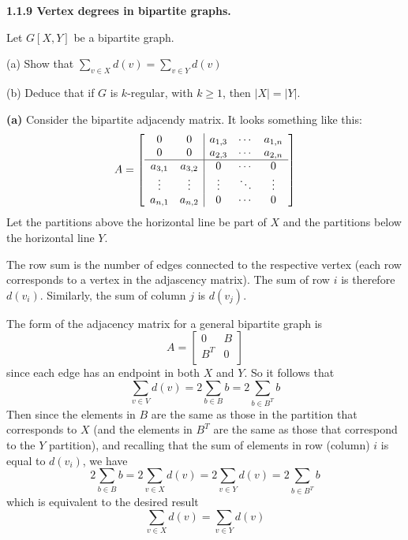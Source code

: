\documentclass{article}
\begin{document}
\bigskip\par\textbf{1.1.9 Vertex degrees in bipartite graphs.}
\par\smallskip
Let $G[X,Y]$ be a bipartite graph.
\par\smallskip
(a) Show that $\sum_{v\in X}d(v)=\sum_{v\in Y}d(v)$
\par
(b) Deduce that if $G$ is $k$-regular, with $k \geq 1$, then $|X|=|Y|$.
\par\smallskip
\textbf{(a)} Consider the bipartite adjacendy matrix. It looks something like this:
\[A= \left[ 
\begin{array}{cc | ccc}
    0 & 0 &  a_{1,3}  & \cdots & a_{1,n} \\
     0 & 0 & a_{2,3}  & \cdots & a_{2,n} \\
 \hline
     a_{3,1} & a_{3,2} & 0  & \cdots & 0 \\
      \vdots & \vdots & \vdots  & \ddots & \vdots \\
     a_{n,1} & a_{n,2} & 0  & \cdots & 0 \\
\end{array} \right]
\]
Let the partitions above the horizontal line be part of $X$ and the partitions below the horizontal line $Y$.
\par\medskip
The row sum is the number of edges connected to the respective vertex (each row corresponds to a vertex in the adjascency matrix). The sum of row $i$ is therefore $d(v_i)$. Similarly, the sum of column $j$ is $d(v_j)$.
\par\medskip
The form of the adjacency matrix for a general bipartite graph is 
\[ A=
\begin{bmatrix}
0 & B\\
B^T & 0\\
\end{bmatrix}
\]
since each edge has an endpoint in both $X$ and $Y$. So it follows that
$$\sum_{v\in V}d(v)=2\sum_{b\in B}b=2\sum_{b\in B^T}b$$
Then since the elements in $B$ are the same as those in the partition that corresponds to $X$ (and the elements in $B^T$ are the same as those that correspond to the $Y$ partition), and recalling that the sum of elements in row (column) $i$ is equal to $d(v_i)$, we have
$$2\sum_{b\in B}b=2\sum_{v\in X}d(v)=2\sum_{v\in Y}d(v)=2\sum_{b\in B^T}b$$
which is equivalent to the desired result 
$$\sum_{v\in X}d(v)=\sum_{v\in Y}d(v)$$
\end{document}
